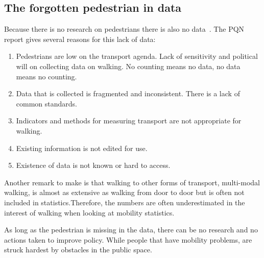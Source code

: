 \subsection{The forgotten pedestrian in data}
Because there is no research on pedestrians there is also no data~\cite{Sauter2010}. The PQN report gives several reasons for this lack of data:
\begin{enumerate}
\item Pedestrians are low on the transport agenda. Lack of sensitivity and political will on collecting data on walking. No counting means no data, no data means no counting.
\item Data that is collected is fragmented and inconsistent. There is a lack of common standards.
\item Indicators and methods for measuring transport are not appropriate for walking.
\item Existing information is not edited for use.
\item Existence of data is not known or hard to access.
\end{enumerate}

Another remark to make is that walking to other forms of transport, multi-modal walking, is almost as extensive as walking from door to door but is often not included in statistics.Therefore, the numbers are often underestimated in the interest of walking when looking at mobility statistics.~\cite{VeiligheidNL2012, Sauter2010} 

As long as the pedestrian is missing in the data, there can be no research and no actions taken to improve policy. While people that have mobility problems, are struck hardest by obstacles in the public space.~\cite{VandeRidder2008} 


